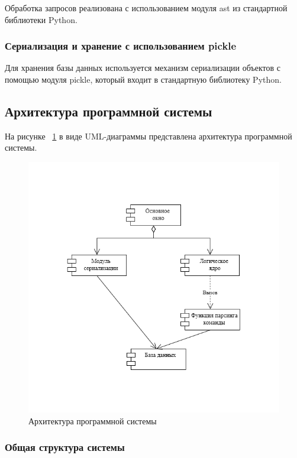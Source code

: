 Обработка запросов реализована с использованием модуля ast из стандартной библиотеки Python.

\subsubsection{Сериализация и хранение с использованием pickle}

Для хранения базы данных используется механизм сериализации объектов с помощью модуля pickle, который входит в стандартную библиотеку Python.

\subsection{Архитектура программной системы}

На рисунке ~\ref{fig:architecture} в виде UML-диаграммы представлена архитектура программной системы.
\begin{figure}[H]
	\centering
	\includegraphics[width=1\linewidth]{images/architecture}
	\caption{Архитектура программной системы}
	\label{fig:architecture}
\end{figure}

\subsubsection{Общая структура системы}

